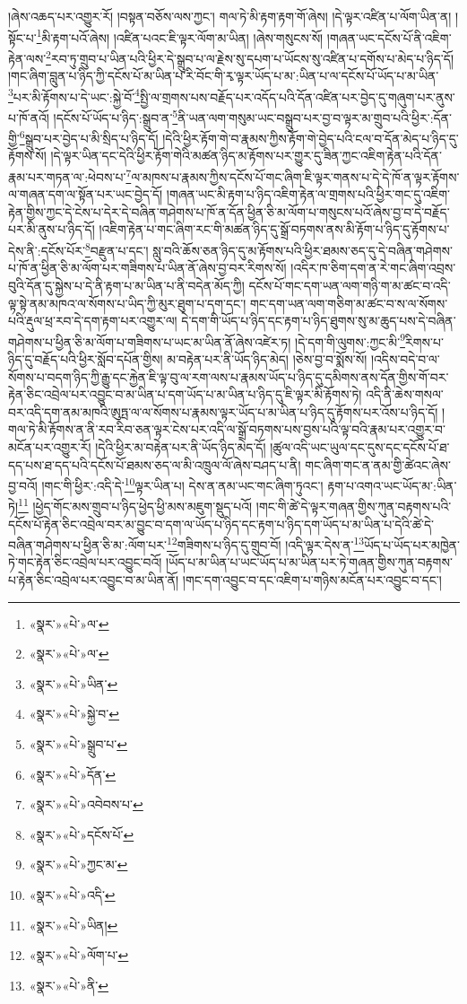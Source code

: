 །ཞེས་འཆད་པར་འགྱུར་རོ། །བསྟན་བཅོས་ལས་ཀྱང་། གལ་ཏེ་མི་རྟག་རྟག་གོ་ཞེས། །དེ་ལྟར་འཛིན་པ་ལོག་ཡིན་ན། །སྟོང་པ་\footnote{«སྣར་»«པེ་»ལ་}མི་རྟག་པའོ་ཞེས། །འཛིན་པའང་ཇི་ལྟར་ལོག་མ་ཡིན། །ཞེས་གསུངས་སོ། །གཞན་ཡང་དངོས་པོ་ནི་འཇིག་རྟེན་ལས་\footnote{«སྣར་»«པེ་»ལ་}རབ་ཏུ་གྲུབ་པ་ཡིན་པའི་ཕྱིར་དེ་སྒྲུབ་པ་ལ་རྗེས་སུ་དཔག་པ་ཡོངས་སུ་འཛིན་པ་དགོས་པ་མེད་པ་ཉིད་དོ། །གང་ཞིག་བླུན་པ་ཉིད་ཀྱི་དངོས་པོ་མ་ཡིན་པ་རི་བོང་གི་རྭ་ལྟར་ཡོད་པ་མ་:ཡིན་པ་ལ་དངོས་པོ་ཡོད་པ་མ་ཡིན་\footnote{«སྣར་»«པེ་»ཡིན་}པར་མི་རྟོགས་པ་དེ་ཡང་:སྐྱེ་བོ་\footnote{«སྣར་»«པེ་»སྐྱེ་བ་}སྤྱི་ལ་གྲགས་པས་བརྗོད་པར་འདོད་པའི་དོན་འཛིན་པར་བྱེད་དུ་གཞུག་པར་ནུས་པ་ཁོ་ནའོ། །དངོས་པོ་ཡོད་པ་ཉིད་:སྒྲུབ་ན་\footnote{«སྣར་»«པེ་»སྒྲུབ་པ་}ནི་ཡན་ལག་གསུམ་ཡང་བསྒྲུབ་པར་བྱ་བ་ལྟར་མ་གྲུབ་པའི་ཕྱིར་:དོན་གྱི་\footnote{«སྣར་»«པེ་»དོན་}སྒྲུབ་པར་བྱེད་པ་མི་སྲིད་པ་ཉིད་དོ། །དེའི་ཕྱིར་རྟོག་གེ་བ་རྣམས་ཀྱིས་རྟོག་གེ་བྱེད་པའི་ངལ་བ་དོན་མེད་པ་ཉིད་དུ་རྟོགས་སོ། །དེ་ལྟར་ཡིན་དང་དེའི་ཕྱིར་རྟོག་གེའི་མཚན་ཉིད་མ་རྟོགས་པར་གྱུར་དུ་ཟིན་ཀྱང་འཇིག་རྟེན་པའི་དོན་རྣམ་པར་གཏན་ལ་:ཕེབས་པ་\footnote{«སྣར་»«པེ་»འབེབས་པ་}ལ་མཁས་པ་རྣམས་ཀྱིས་དངོས་པོ་གང་ཞིག་ཇི་ལྟར་གནས་པ་དེ་དེ་ཁོ་ན་ལྟར་རྟོགས་ལ་གཞན་དག་ལ་སྟོན་པར་ཡང་བྱེད་དོ། །གཞན་ཡང་མི་རྟག་པ་ཉིད་འཇིག་རྟེན་ལ་གྲགས་པའི་ཕྱིར་གང་དུ་འཇིག་རྟེན་གྱིས་ཀྱང་དེ་ངེས་པ་དེར་དེ་བཞིན་གཤེགས་པ་ཁོ་ན་དོན་ཕྱིན་ཅི་མ་ལོག་པ་གསུངས་པའོ་ཞེས་བྱ་བ་དེ་བརྗོད་པར་མི་ནུས་པ་ཉིད་དོ། །འཇིག་རྟེན་པ་གང་ཞིག་རང་གི་མཚན་ཉིད་དུ་སྒྲོ་བཏགས་ནས་མི་རྟོག་པ་ཉིད་དུ་རྟོགས་པ་དེས་ནི་:དངོས་པོར་\footnote{«སྣར་»«པེ་»དངོས་པོ་}བརྫུན་པ་དང་། སླུ་བའི་ཆོས་ཅན་ཉིད་དུ་མ་རྟོགས་པའི་ཕྱིར་ཐམས་ཅད་དུ་དེ་བཞིན་གཤེགས་པ་ཁོ་ན་ཕྱིན་ཅི་མ་ལོག་པར་གཟིགས་པ་ཡིན་ནོ་ཞེས་བྱ་བར་རིགས་སོ། །འདིར་ཁ་ཅིག་དག་ན་རེ་གང་ཞིག་འབྲས་བུའི་དོན་དུ་སྐྱེས་པ་དེ་ནི་རྟག་པ་མ་ཡིན་པ་ནི་བདེན་མོད་ཀྱི། དངོས་པོ་གང་དག་ཡན་ལག་གཉི་ག་མ་ཚང་བ་འདི་ལྟ་སྟེ་ནམ་མཁའ་ལ་སོགས་པ་ཡིད་ཀྱི་མུར་ཐུག་པ་དག་དང་། གང་དག་ཡན་ལག་གཅིག་མ་ཚང་བ་ས་ལ་སོགས་པའི་རྡུལ་ཕྲ་རབ་དེ་དག་རྟག་པར་འགྱུར་ལ། དེ་དག་གི་ཡོད་པ་ཉིད་དང་རྟག་པ་ཉིད་ཐུགས་སུ་མ་ཆུད་པས་དེ་བཞིན་གཤེགས་པ་ཕྱིན་ཅི་མ་ལོག་པ་གཟིགས་པ་ཡང་མ་ཡིན་ནོ་ཞེས་འཛེར་ཏ། །དེ་དག་གི་ལུགས་:ཀྱང་མི་\footnote{«སྣར་»«པེ་»ཀྱང་མ་}རིགས་པ་ཉིད་དུ་བརྗོད་པའི་ཕྱིར་སློབ་དཔོན་གྱིས། མ་བརྟེན་པར་ནི་ཡོད་ཉིད་མེད། །ཅེས་བྱ་བ་སྨོས་སོ། །འདིས་བདེ་བ་ལ་སོགས་པ་བདག་ཉིད་ཀྱི་རྒྱུ་དང་རྐྱེན་ཇི་ལྟ་བུ་ལ་རག་ལས་པ་རྣམས་ཡོད་པ་ཉིད་དུ་དམིགས་ནས་དོན་གྱིས་གོ་བར་རྟེན་ཅིང་འབྲེལ་པར་འབྱུང་བ་མ་ཡིན་པ་དག་ཡོད་པ་མ་ཡིན་པ་ཉིད་དུ་ཇི་ལྟར་མི་རྟོགས་ཏེ། འདི་ནི་ཆེས་གསལ་བར་འདི་དག་ནམ་མཁའི་ཨུཏྤ་ལ་ལ་སོགས་པ་རྣམས་ལྟར་ཡོད་པ་མ་ཡིན་པ་ཉིད་དུ་རྟོགས་པར་འོས་པ་ཉིད་དོ། །གལ་ཏེ་མི་རྟོགས་ན་ནི་རབ་རིབ་ཅན་ལྟར་ངེས་པར་འདི་ལ་སྒྲོ་བཏགས་པས་བྱས་པའི་ལྟ་བའི་རྣམ་པར་འགྱུར་བ་མངོན་པར་འགྱུར་རོ། །དེའི་ཕྱིར་མ་བརྟེན་པར་ནི་ཡོད་ཉིད་མེད་དོ། །ཚུལ་འདི་ཡང་ཡུལ་དང་དུས་དང་དངོས་པོ་ཐ་དད་པས་ཐ་དད་པའི་དངོས་པོ་ཐམས་ཅད་ལ་མི་འཁྲུལ་ལོ་ཞེས་བཤད་པ་ནི། གང་ཞིག་གང་ན་ནམ་གྱི་ཚེའང་ཞེས་བྱ་བའོ། །གང་གི་ཕྱིར་:འདི་དེ་\footnote{«སྣར་»«པེ་»འདི་}ལྟར་ཡིན་པ། དེས་ན་ནམ་ཡང་གང་ཞིག་ཏུའང་། རྟག་པ་འགའ་ཡང་ཡོད་མ་:ཡིན་ཏེ།\footnote{«སྣར་»«པེ་»ཡིན།} །ཕྱེད་གོང་མས་གྲུབ་པ་ཉིད་ཕྱེད་ཕྱི་མས་མཇུག་སྡུད་པའོ། །གང་གི་ཚེ་དེ་ལྟར་གཞན་གྱིས་ཀུན་བརྟགས་པའི་དངོས་པོ་རྟེན་ཅིང་འབྲེལ་བར་མ་བྱུང་བ་དག་ལ་ཡོད་པ་ཉིད་དང་རྟག་པ་ཉིད་དག་ཡོད་པ་མ་ཡིན་པ་དེའི་ཚེ་དེ་བཞིན་གཤེགས་པ་ཕྱིན་ཅི་མ་:ལོག་པར་\footnote{«སྣར་»«པེ་»ལོག་པ་}གཟིགས་པ་ཉིད་དུ་གྲུབ་བོ། །འདི་ལྟར་དེས་ན་\footnote{«སྣར་»«པེ་»ནི་}ཡོད་པ་ཡོད་པར་མཁྱེན་ཏེ་གང་རྟེན་ཅིང་འབྲེལ་པར་འབྱུང་བའོ། །ཡོད་པ་མ་ཡིན་པ་ཡང་ཡོད་པ་མ་ཡིན་པར་ཏེ་གཞན་གྱིས་ཀུན་བརྟགས་པ་རྟེན་ཅིང་འབྲེལ་པར་འབྱུང་བ་མ་ཡིན་ནོ། །གང་དག་འབྱུང་བ་དང་འཇིག་པ་གཉིས་མངོན་པར་འབྱུང་བ་དང་། 